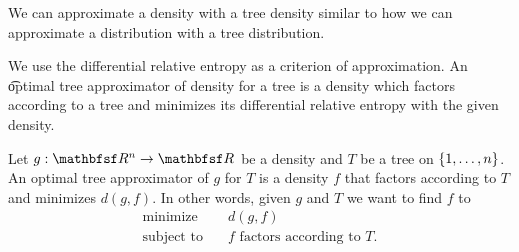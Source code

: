 





















\sstart
{}


We can approximate a density with a tree density similar to how we can approximate a distribution with a tree distribution.


We use the differential relative entropy as a criterion of approximation.
An \t{optimal tree approximator} of density for a tree is a density which factors according to a tree and minimizes its differential relative entropy with the given density.


Let $g: \R^n \to \R$ be a density and $T$ be a tree on $\{1, \dots, n\}$.
An optimal tree approximator of $g$ for $T$ is a density $f$ that factors according to $T$ and minimizes $d(g, f)$.
In other words, given $g$ and $T$ we want to find $f$ to
\[
  \begin{aligned}
    \text{minimize}   &\quad d(g, f) \\
    \text{subject to} &\quad f \text{ factors according to } T.
  \end{aligned}
\]


